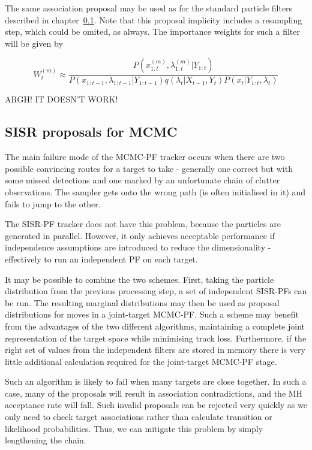 The same association proposal may be used as for the standard particle filters described in chapter~\ref{}. Note that this proposal implicity includes a resampling step, which could be omited, as always. The importance weights for such a filter will be given by

\begin{equation}
W_t^{(m)} \approx \frac{ P(x_{1:t}^{(m)}, \lambda_{1:t}^{(m)}|Y_{1:t}) }{ P(x_{1:t-1}, \lambda_{1:t-1}|Y_{1:t-1}) q(\lambda_t|X_{t-1}, Y_t) P(x_t|Y_{1:t}, \lambda_t) }
\end{equation}

ARGH! IT DOESN'T WORK!



\subsection{SISR proposals for MCMC}
The main failure mode of the MCMC-PF tracker occurs when there are two possible convincing routes for a target to take - generally one correct but with some missed detections and one marked by an unfortunate chain of clutter observations. The sampler gets onto the wrong path (is often initialised in it) and fails to jump to the other.

The SISR-PF tracker does not have this problem, because the particles are generated in parallel. However, it only achieves acceptable performance if independence assumptions are introduced to reduce the dimensionality - effectively to run an independent PF on each target.

It may be possible to combine the two schemes. First, taking the particle distribution from the previous processing step, a set of independent SISR-PFs can be run. The resulting marginal distributions may then be used as proposal distributions for moves in a joint-target MCMC-PF. Such a scheme may benefit from the advantages of the two different algorithms, maintaining a complete joint representation of the target space while minimising track loss. Furthermore, if the right set of values from the independent filters are stored in memory there is very little additional calculation required for the joint-target MCMC-PF stage.

Such an algorithm is likely to fail when many targets are close together. In such a case, many of the proposals will result in association contradictions, and the MH acceptance rate will fall. Such invalid proposals can be rejected very quickly as we only need to check target associations rather than calculate transition or likelihood probabilities. Thus, we can mitigate this problem by simply lengthening the chain.



